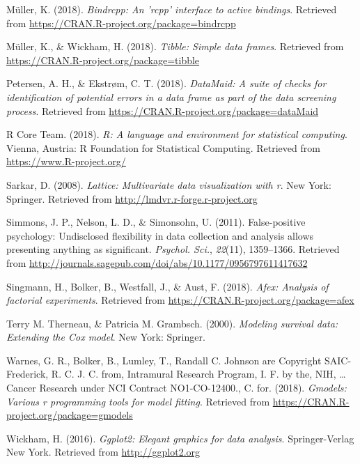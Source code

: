 \documentclass[english,man]{apa6}
\theoremstyle{definition}
\theoremstyle{definition}
\theoremstyle{definition}
\theoremstyle{remark}
\begin{document}
\hypertarget{ref-R-bindrcpp}{}
Müller, K. (2018). \emph{Bindrcpp: An 'rcpp' interface to active
bindings}. Retrieved from
\url{https://CRAN.R-project.org/package=bindrcpp}

\hypertarget{ref-R-tibble}{}
Müller, K., \& Wickham, H. (2018). \emph{Tibble: Simple data frames}.
Retrieved from \url{https://CRAN.R-project.org/package=tibble}

\hypertarget{ref-R-dataMaid}{}
Petersen, A. H., \& Ekstrøm, C. T. (2018). \emph{DataMaid: A suite of
checks for identification of potential errors in a data frame as part of
the data screening process}. Retrieved from
\url{https://CRAN.R-project.org/package=dataMaid}

\hypertarget{ref-R-base}{}
R Core Team. (2018). \emph{R: A language and environment for statistical
computing}. Vienna, Austria: R Foundation for Statistical Computing.
Retrieved from \url{https://www.R-project.org/}

\hypertarget{ref-R-lattice}{}
Sarkar, D. (2008). \emph{Lattice: Multivariate data visualization with
r}. New York: Springer. Retrieved from
\url{http://lmdvr.r-forge.r-project.org}

\hypertarget{ref-Simmons2011-za}{}
Simmons, J. P., Nelson, L. D., \& Simonsohn, U. (2011). False-positive
psychology: Undisclosed flexibility in data collection and analysis
allows presenting anything as significant. \emph{Psychol. Sci.},
\emph{22}(11), 1359--1366. Retrieved from
\url{http://journals.sagepub.com/doi/abs/10.1177/0956797611417632}

\hypertarget{ref-R-afex}{}
Singmann, H., Bolker, B., Westfall, J., \& Aust, F. (2018). \emph{Afex:
Analysis of factorial experiments}. Retrieved from
\url{https://CRAN.R-project.org/package=afex}

\hypertarget{ref-R-survival-book}{}
Terry M. Therneau, \& Patricia M. Grambsch. (2000). \emph{Modeling
survival data: Extending the Cox model}. New York: Springer.

\hypertarget{ref-R-gmodels}{}
Warnes, G. R., Bolker, B., Lumley, T., Randall C. Johnson are Copyright
SAIC-Frederick, R. C. J. C. from, Intramural Research Program, I. F. by
the, NIH, \ldots{} Cancer Research under NCI Contract NO1-CO-12400., C.
for. (2018). \emph{Gmodels: Various r programming tools for model
fitting}. Retrieved from
\url{https://CRAN.R-project.org/package=gmodels}

\hypertarget{ref-R-ggplot2}{}
Wickham, H. (2016). \emph{Ggplot2: Elegant graphics for data analysis}.
Springer-Verlag New York. Retrieved from \url{http://ggplot2.org}
\end{document}
